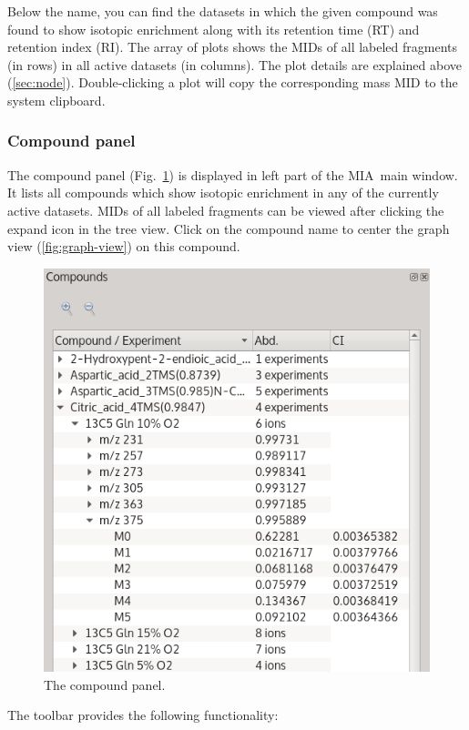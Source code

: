 \documentclass[a4paper,12pt]{scrartcl}
\newcommand*\app{\textsc{MIA}}
\begin{document}
Below the name, you can find the datasets in which the given compound was found to show isotopic enrichment along with its retention time (RT) and retention index (RI). The array of plots shows the MIDs of all labeled fragments (in rows) in all active datasets (in columns). The plot details are explained above (\ref{sec:node}). Double-clicking a plot will copy the corresponding mass MID to the system clipboard.

\subsubsection{Compound panel}

\label{sec:compound-panel}

The compound panel (Fig.~\ref{fig:compound-panel}) is displayed in left part of the \app\ main window. It lists all compounds which show isotopic enrichment in any of the currently active datasets. MIDs of all labeled fragments can be viewed after clicking the expand icon in the tree view. Click on the compound name to center the graph view (\ref{fig:graph-view}) on this compound.

\begin{figure}[htb]
 \centering
 \includegraphics[width=0.4\linewidth]{./gfx/ss_compound_panel.png}
 \caption{The compound panel.}
 \label{fig:compound-panel}
\end{figure}

The toolbar provides the following functionality:
\end{document}
